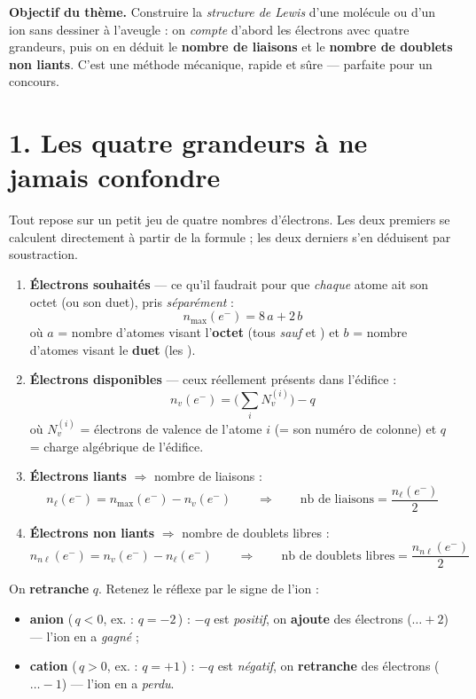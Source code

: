 \documentclass[11pt,a4paper]{article}
\newcommand{\nmax}{n_{\max}(e^-)}
\newcommand{\nv}{n_{v}(e^-)}
\newcommand{\nl}{n_{\ell}(e^-)}
\newcommand{\nnl}{n_{n\ell}(e^-)}
\begin{document}
\begin{tcolorbox}[boxbase,colback=primary!12,colframe=primary,
   title={\Large Thème 2 — Méthode des 5 étapes et structure de Lewis}]
\textbf{Objectif du thème.} Construire la \emph{structure de Lewis} d'une molécule ou d'un ion
sans dessiner à l'aveugle : on \emph{compte} d'abord les électrons avec quatre grandeurs, puis on
en déduit le \textbf{nombre de liaisons} et le \textbf{nombre de doublets non liants}. C'est une
méthode mécanique, rapide et sûre — parfaite pour un concours.
\end{tcolorbox}

\section*{1. Les quatre grandeurs à ne jamais confondre}

Tout repose sur un petit jeu de quatre nombres d'électrons. Les deux premiers se calculent
directement à partir de la formule ; les deux derniers s'en déduisent par soustraction.

\begin{defbox}
\begin{enumerate}[leftmargin=1.7em,topsep=2pt,itemsep=4pt]
  \item \textbf{Électrons souhaités} — ce qu'il faudrait pour que \emph{chaque} atome ait son
        octet (ou son duet), pris \emph{séparément} :
        \[ \nmax = 8\,a + 2\,b \]
        où $a$ = nombre d'atomes visant l'\textbf{octet} (tous \emph{sauf}  et ) et
        $b$ = nombre d'atomes visant le \textbf{duet} (les ).
  \item \textbf{Électrons disponibles} — ceux réellement présents dans l'édifice :
        \[ \nv = \Big(\textstyle\sum_i N_v^{(i)}\Big) - q \]
        où $N_v^{(i)}$ = électrons de valence de l'atome $i$ (= son numéro de colonne) et $q$ =
        charge algébrique de l'édifice.
  \item \textbf{Électrons liants} $\Rightarrow$ nombre de liaisons :
        \[ \nl = \nmax - \nv \qquad\Longrightarrow\qquad \text{nb de liaisons} = \frac{\nl}{2} \]
  \item \textbf{Électrons non liants} $\Rightarrow$ nombre de doublets libres :
        \[ \nnl = \nv - \nl \qquad\Longrightarrow\qquad \text{nb de doublets libres} = \frac{\nnl}{2} \]
\end{enumerate}
\end{defbox}

\begin{attnbox}[le signe de la charge $q$ dans $\nv$]
On \textbf{retranche} $q$. Retenez le réflexe par le signe de l'ion :
\begin{itemize}[leftmargin=1.6em,topsep=1pt,itemsep=1pt]
  \item \textbf{anion} (\,$q<0$, ex.  : $q=-2$\,) : $-q$ est \emph{positif}, on
        \textbf{ajoute} des électrons ($\dots+2$) — l'ion en a \emph{gagné} ;
  \item \textbf{cation} (\,$q>0$, ex.  : $q=+1$\,) : $-q$ est \emph{négatif}, on
        \textbf{retranche} des électrons ($\dots-1$) — l'ion en a \emph{perdu}.
\end{itemize}
\end{attnbox}
\end{document}
